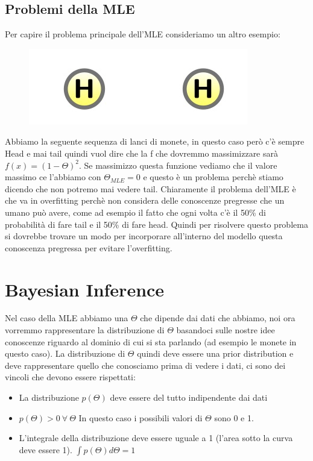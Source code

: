\documentclass[14pt]{extreport}
\begin{document}
\subsection{Problemi della MLE}

Per capire il problema principale dell'MLE consideriamo un altro esempio:
\begin{figure}[H]
\centering
\includegraphics[width=0.3\linewidth]{27.jpeg}
\end{figure}
Abbiamo la seguente sequenza di lanci di monete, in questo caso però c'è sempre Head e mai tail quindi vuol dire che la f che dovremmo massimizzare
sarà $f(x)=(1-\Theta)^2$. Se massimizzo questa funzione vediamo che il valore massimo ce l'abbiamo con $\Theta_{MLE} = 0$ e questo è un problema
perchè stiamo dicendo che non potremo mai vedere tail. Chiaramente il problema dell'MLE è che va in overfitting perchè non considera delle conoscenze
pregresse che un umano può avere, come ad esempio il fatto che ogni volta c'è il 50\% di probabilità di fare tail e il 50\% di fare head. Quindi per
risolvere questo problema si dovrebbe trovare un modo per incorporare all'interno del modello questa conoscenza pregressa per evitare l'overfitting.


\section{Bayesian Inference}

Nel caso della MLE abbiamo una $\Theta$ che dipende dai dati che abbiamo, noi ora vorremmo rappresentare la distribuzione di $\Theta$ basandoci sulle
nostre idee conoscenze riguardo al dominio di cui si sta parlando (ad esempio le monete in questo caso). La distribuzione di $\Theta$ quindi deve
essere una prior distribution e deve rappresentare quello che conosciamo prima di vedere i dati, ci sono dei vincoli che devono essere rispettati:
\begin{itemize}
\item La distribuzione $p(\Theta)$ deve essere del tutto indipendente dai dati
\item $p(\Theta)>0 \ \forall \ \Theta$ In questo caso i possibili valori di $\Theta$ sono 0 e 1.
\item L'integrale della distribuzione deve essere uguale a 1 (l'area sotto la curva deve essere 1). $\int p(\Theta) d\Theta = 1$
\end{itemize}
\end{document}
